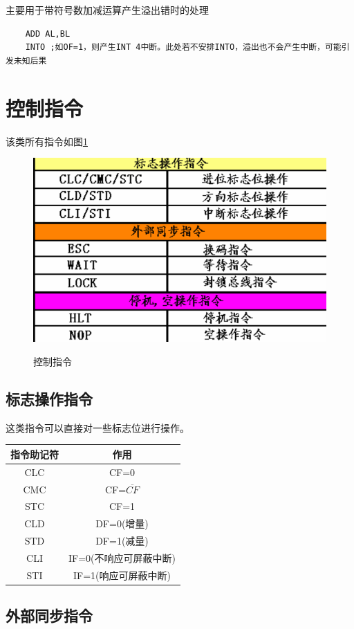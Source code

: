 主要用于带符号数加减运算产生溢出错时的处理
\begin{lstlisting}
    ADD AL,BL 
    INTO ;如OF=1，则产生INT 4中断。此处若不安排INTO，溢出也不会产生中断，可能引发未知后果
\end{lstlisting}
\section{控制指令}
该类所有指令如图\ref{控制指令}
\begin{figure}[H]
    \centering 
    \includegraphics[scale=1]{part_指令系统/part_指令系统_pic/控制指令.png}
    \label{控制指令}
    \caption{控制指令}
\end{figure}
\subsection{标志操作指令}
这类指令可以直接对一些标志位进行操作。
\begin{table}[H]
    \centering 
    \begin{tabular}{cc}
        \hline 
        指令助记符 & 作用 \\ \hline 
        CLC &CF=0\\
        CMC &CF=$\overline{CF}$\\
        STC &CF=1\\
        CLD &DF=0(增量)\\
        STD &DF=1(减量)\\
        CLI &IF=0(不响应可屏蔽中断)\\
        STI &IF=1(响应可屏蔽中断)\\ \hline 
    \end{tabular}
\end{table}
\subsection{外部同步指令}

